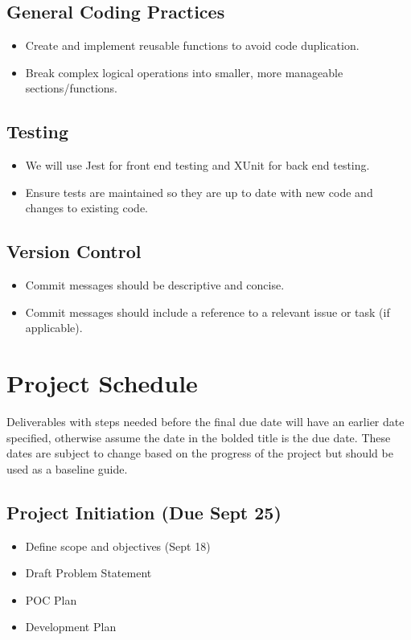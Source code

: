 \documentclass{article}
\begin{document}
	\subsection{General Coding Practices}
	\begin{itemize}
		\item Create and implement reusable functions to avoid code duplication.
		\item Break complex logical operations into smaller, more manageable sections/functions.
	\end{itemize}

	\subsection{Testing}
	\begin{itemize}
		\item We will use Jest for front end testing and XUnit for back end testing.
		\item Ensure tests are maintained so they are up to date with new code and changes to existing code.
	\end{itemize}

	\subsection{Version Control}
	\begin{itemize}
		\item Commit messages should be descriptive and concise.
		\item Commit messages should include a reference to a relevant issue or task (if applicable).
	\end{itemize}

	\section{Project Schedule}

	Deliverables with steps needed before the final due date will have an earlier date specified, otherwise assume the date in the bolded title is the due date. These dates are subject to change based on the progress of the project but should be used as a baseline guide.

	\subsection{Project Initiation (Due Sept 25)}
	\begin{itemize}
		\item Define scope and objectives (Sept 18)
		\item Draft Problem Statement
		\item POC Plan
		\item Development Plan
	\end{itemize}
\end{document}
